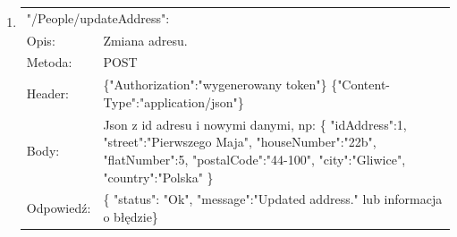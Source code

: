 \documentclass[12pt, titlepage]{article}
\begin{document}
\begin{enumerate}
	\item
	{\renewcommand{\arraystretch}{1.5}
	\begin{tabular}[t]{p{3cm} p{15cm}}
	\multicolumn{2}{l}{"/People/updateAddress":} \\
	Opis: & Zmiana adresu. \\
	Metoda: & POST \\
	Header: & \{"Authorization":"wygenerowany token"\} \newline \{"Content-Type":"application/json"\} \\
	Body: & Json z id adresu i nowymi danymi, np: \newline
	\{
	"idAddress":1,\newline
    "street":"Pierwszego Maja",\newline
    "houseNumber":"22b",\newline
    "flatNumber":5,\newline
    "postalCode":"44-100",\newline
    "city":"Gliwice",\newline
    "country":"Polska"
\}\\
	Odpowiedź: & \{
    "status": "Ok",\newline
    "message":"Updated address." lub informacja o błędzie\} 
	\end{tabular}}
	

\end{enumerate}
\end{document}
